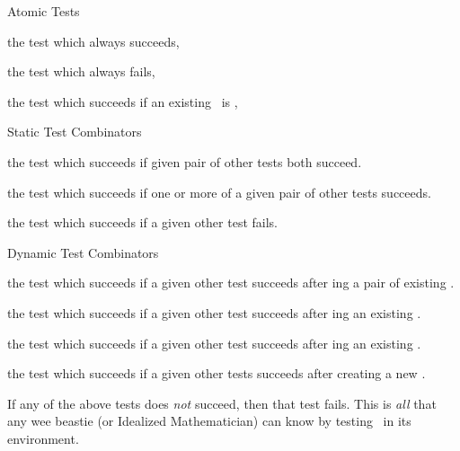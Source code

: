 
\startitemize[n]

\item Atomic Tests

\startitemize[n]

\item the test which always succeeds,

\item the test which always fails,

\item the test which succeeds if an existing \lol\ is 
,

\stopitemize

\item Static Test Combinators

\startitemize[n]

\item the test which succeeds if given pair of other tests both succeed.

\item the test which succeeds if one or more of a given pair of other 
tests succeeds. 

\item the test which succeeds if a given other test fails.

\stopitemize

\item Dynamic Test Combinators

\startitemize[n]

\item the test which succeeds if a given other test succeeds after 
ing a pair of existing \lols.

\item the test which succeeds if a given other test succeeds after 
ing an existing \lol.


\item the test which succeeds if a given other test succeeds after 
ing an existing \lol.

\item the test which succeeds if a given other tests succeeds after 
creating a new  \lol.

\stopitemize

\stopitemize

If any of the above tests does \emph{not} succeed, then that test fails. 
This is \emph{all} that any wee beastie (or Idealized Mathematician) can 
know by testing \lols\ in its environment. 

